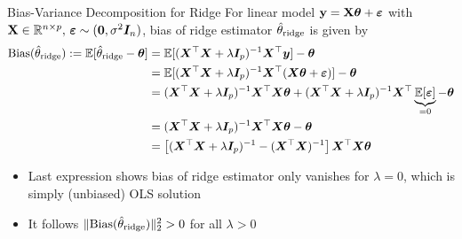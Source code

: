 \documentclass[11pt,compress,t,notes=noshow, xcolor=table]{beamer}
\begin{document}
\begin{vbframe}{Bias-Variance Decomposition for Ridge}
For linear model $\mathbf{y} = \mathbf{X} \bm{\theta} + \bm{\varepsilon}$ with $\mathbf{X} \in \mathbb{R}^{n \times p},\,\bm{\varepsilon} \sim (\bm{0},\sigma^2 \bm{I}_n)$, bias of ridge estimator $\hat{\theta}_{\text{ridge}}$ is given by 
\begin{equation*}
    \begin{aligned}
        \text{Bias}(\hat{\theta}_{\text{ridge}}) := \mathbb{E}[\hat{\theta}_{\text{ridge}}-\bm{\theta}] &= \mathbb{E}[(\bm{X}^{\top}\bm{X} +\lambda\bm{I}_p )^{-1} \bm{X}^{\top}\bm{y}] - \bm{\theta}\\
        &= \mathbb{E}[(\bm{X}^{\top}\bm{X} +\lambda\bm{I}_p )^{-1} \bm{X}^{\top}(\bm{X}\bm{\theta}+\bm{\varepsilon})] - \bm{\theta} \\
        &= (\bm{X}^{\top}\bm{X} +\lambda\bm{I}_p )^{-1} \bm{X}^{\top} \bm{X} \bm{\theta} + (\bm{X}^{\top}\bm{X} +\lambda\bm{I}_p )^{-1} \bm{X}^{\top} \underbrace{\mathbb{E}[\bm{\varepsilon}]}_{=0} - \bm{\theta} \\
        &= (\bm{X}^{\top}\bm{X} +\lambda\bm{I}_p )^{-1} \bm{X}^{\top} \bm{X} \bm{\theta} - \bm{\theta} \\
        &= \left[(\bm{X}^{\top}\bm{X} +\lambda\bm{I}_p )^{-1} - (\bm{X}^{\top} \bm{X})^{-1} \right] \bm{X}^{\top} \bm{X} \bm{\theta}
        \end{aligned}
    \end{equation*}

\begin{itemize}
    \item Last expression shows bias of ridge estimator only vanishes for $\lambda=0$, which is simply (unbiased) OLS solution
    \item It follows $\Vert \text{Bias}(\hat{\theta}_{\text{ridge}})\Vert_2^2>0$ for all $\lambda>0$
\end{itemize}


\end{vbframe}
\end{document}
